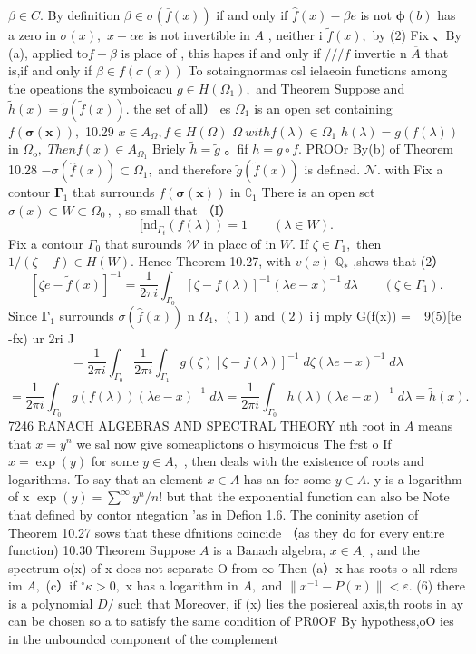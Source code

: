 $\beta\in C.$ By definition $\beta\in\sigma({\bar{f}}(x))$ if and only if $\scriptstyle{\hat{f}}(x)-\beta e$ is not $\mathbf{\phi}(b)$ has a zero in $\sigma(x),$ $x-\alpha e$ is not invertible in $\scriptstyle A$ , neither i ${\tilde{f}}(x),$ by (2) Fix 、By (a), applied $\mathrm{to}f-\beta$ is place of , this hapes if and only if $///f$ invertie n $\overline{{A}}$ that is,if and only if $\beta\in f(\sigma(x))$ To sotaingnormas osl ielaeoin functions among the opeations the symboicacu $g\in H(\Omega_{1}),$ and Theorem Suppose and ${\tilde{h}}(x)={\tilde{g}}({\tilde{f}}(x)).$ the set of all） es $\Omega_{1}$ is an open set containing $f({\boldsymbol{\sigma}}({\boldsymbol{x}})),$ 10.29 $x\in A_{\Omega},f\in H(\Omega)$ $\Omega\ w i t h f(\lambda)\in\Omega_{1}$ $h(\lambda)=g(f(\lambda))$ in $\Omega_{\mathrm{o}},$ $T h e n f(x)\in A_{\Omega_{1}}$ Briely ${\tilde{h}}={\tilde{g}}$ 。fif $h=g\circ f.$ PROOr By(b) of Theorem 10.28 $-\sigma({\hat{f}}(x))\subset\Omega_{1},$ and therefore ${\tilde{g}}({\tilde{f}}(x))$ is defined. ${\mathcal{N}}.$ with Fix a contour ${\boldsymbol{\Gamma}}_{1}$ that surrounds $f({\boldsymbol{\sigma}}({\boldsymbol{x}}))$ in $\complement_{1}$ There is an open sct $\sigma(x)\subset W\subset\Omega_{0}\,,$ , so small that （I） $$ [\mathrm{nd}_{\Gamma_{t}}\left(f(\lambda)\right)=1\qquad(\lambda\in W). $$ Fix a contour $\Gamma_{0}$ that surounds ${\mathcal{W}}$ in placc of in $\textstyle W.$ If $\zeta\in\Gamma_{1},$ then $1/(\zeta-f)\in H(W).$ Hence Theorem 10.27, with $\scriptstyle v(x)$ $\mathbb{Q}_{*}$ ,shows that (2） $$ [\zeta e-\tilde{f}(x)]^{-1}=\frac{1}{2\pi i}\int_{\Gamma_{0}}[\zeta-f(\lambda)]^{-1}(\lambda e-x)^{-1}\,d\lambda\qquad(\zeta\in\Gamma_{1}). $$ Since ${\boldsymbol{\Gamma}}_{1}$ surrounds $\sigma({\hat{f}}(x))$ n $\Omega_{1},\;(1){\mathrm{~and~}}(2)\;{\mathrm{i}}{\mathrm{~j}}$ mply G(f(x)) = _9(5)[te -fx) ur 2ri J $$ =\frac{1}{2\pi i}\int_{\Gamma_{0}}\frac{1}{2\pi i}\int_{\Gamma_{1}}g(\zeta)[\zeta-f(\lambda)]^{-1}\;d\zeta(\lambda e-x)^{-1}\;d\lambda $$ $$ =\frac{1}{2\pi i}\int_{\Gamma_{0}}g(f(\lambda))(\lambda e-x)^{-1}\;d\lambda=\frac{1}{2\pi i}\int_{\Gamma_{0}}h(\lambda)(\lambda e-x)^{-1}\;d\lambda=\tilde{h}(x). $$ 7246 RANACH ALGEBRAS AND SPECTRAL THEORY nth root in $\textstyle A$ means that $x=y^{n}$ we sal now give someaplictons o hisymoicus The frst o If $x=\exp{(y)}$ for some $y\in A,$ , then deals with the existence of roots and logarithms. To say that an element $x\in A$ has an for some $y\in A.$ y is a logarithm of x $\exp{(y)}=\sum^{\infty}y^{n}/n!$ but that the exponential function can also be Note that defined by contor ntegation 'as in Defion 1.6. The coninity asetion of Theorem 10.27 sows that these dfnitions coincide （as they do for every entire function) 10.30 Theorem Suppose $\scriptstyle A$ is a Banach algebra, $x\in A_{\cdot}$ , and the spectrum o(x) of x does not separate O from $\infty$ Then (a）x has roots o all rders im ${\bar{A}},$ (c）if ${^{\circ}\kappa>0},$ x has a logarithm in ${\bar{A}},$ and $\|x^{-1}-P(x)\|<\varepsilon.$ (6) there is a polynomial $D\!\!\!\!/$ such that Moreover, if (x) lies the posiereal axis,th roots in ay can be chosen so a to satisfy the same condition of PR0OF By hypothess,oO ies in the unboundcd component of the complement 